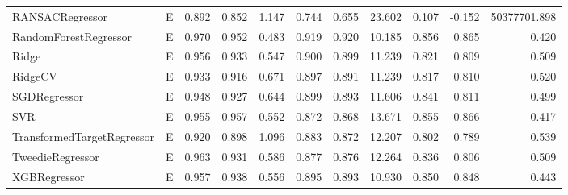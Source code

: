 \begin{table}[t!]
\begin{adjustbox}{max width=\textwidth}
\begin{tabular}{llrrrrrrrrr}
RANSACRegressor & E & 0.892 & 0.852 & 1.147 & 0.744 & 0.655 & 23.602 & 0.107 & -0.152 & 50377701.898 \\
RandomForestRegressor & E & 0.970 & 0.952 & 0.483 & 0.919 & 0.920 & 10.185 & 0.856 & 0.865 & 0.420 \\
Ridge & E & 0.956 & 0.933 & 0.547 & 0.900 & 0.899 & 11.239 & 0.821 & 0.809 & 0.509 \\
RidgeCV & E & 0.933 & 0.916 & 0.671 & 0.897 & 0.891 & 11.239 & 0.817 & 0.810 & 0.520 \\
SGDRegressor & E & 0.948 & 0.927 & 0.644 & 0.899 & 0.893 & 11.606 & 0.841 & 0.811 & 0.499 \\
SVR & E & 0.955 & 0.957 & 0.552 & 0.872 & 0.868 & 13.671 & 0.855 & 0.866 & 0.417 \\
TransformedTargetRegressor & E & 0.920 & 0.898 & 1.096 & 0.883 & 0.872 & 12.207 & 0.802 & 0.789 & 0.539 \\
TweedieRegressor & E & 0.963 & 0.931 & 0.586 & 0.877 & 0.876 & 12.264 & 0.836 & 0.806 & 0.509 \\
XGBRegressor & E & 0.957 & 0.938 & 0.556 & 0.895 & 0.893 & 10.930 & 0.850 & 0.848 & 0.443 \\
\bottomrule
\end{tabular}
\end{adjustbox}
\end{table}
